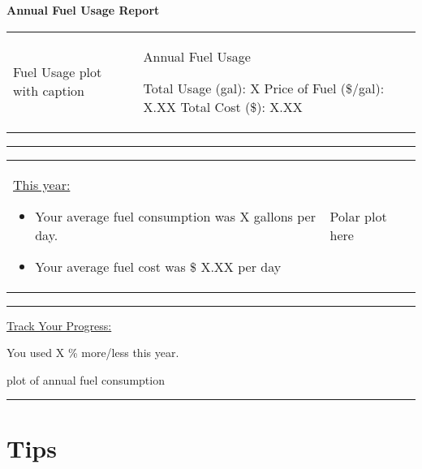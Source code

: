 \documentclass[12pt,a4paper]{article}
\begin{document}
\begin{center}

\textbf{\Huge{Annual Fuel Usage Report}}

\end{center}

\begin{center}


\end{center}

\vspace{12pt}

\begin{tabu}{X|X}

Fuel Usage plot with caption

&

Annual Fuel Usage

Total Usage (gal): X
Price of Fuel (\$/gal): X.XX
Total Cost (\$): X.XX

\end{tabu}

\vspace{12pt}
\rule{\textwidth}{1pt}
\vspace{12pt}

\begin{tabu}{XX}

\underline{This year:}

\begin{itemize}

\item Your average fuel consumption was X gallons per day.
\item Your average fuel cost was \$ X.XX per day

\end{itemize}

&

Polar plot here

\end{tabu}

\vspace{12pt}
\rule{\textwidth}{1pt}
\vspace{12pt}

\underline{Track Your Progress:}

You used X \% more/less this year.

plot of annual fuel consumption

\vspace{12pt}
\rule{\textwidth}{1pt}
\vspace{12pt}

\section*{Tips}

\end{document}
